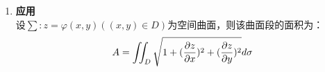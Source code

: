 \documentclass[12pt]{scrartcl}
\begin{document}
{\begin{enumerate}
\begin{enumerate}
\begin{itemize}
               \item 极坐标变换\\
               $\iint _Df(x,y)d\sigma =\int_{\alpha}^{\beta}  \,d\theta\int_{r_1(\theta)}^{r_2(\theta)} rf(r\cos \theta,r\sin \theta) \,dr  $
               用极坐标计算二重积分一般至少需要满足如下两个特征之一：
               \begin{itemize}
                   \item 积分区域的边界曲线含$x^2+y^2$
                   \item 被积函数f(x,y)的表达式中含$x^2+y^2$
               \end{itemize}
           \end{itemize}
           \item x型区域与y型区域
           \begin{figure}[htbp]
            \centering
            \texttt{[image: 1.png]}
            \end{figure}
       \end{enumerate}  
    \item \textbf{应用}\\
    设$\sum :z=\varphi (x,y)((x,y)\in D)$为空间曲面，则该曲面段的面积为：
    \begin{align}
        A=\iint _D\sqrt{1+(\frac{\partial z}{\partial x})^2+(\frac{\partial z}{\partial y})^2}d\sigma \notag
    \end{align}

    
\end{enumerate}
\newpage
    

}
\end{document}
